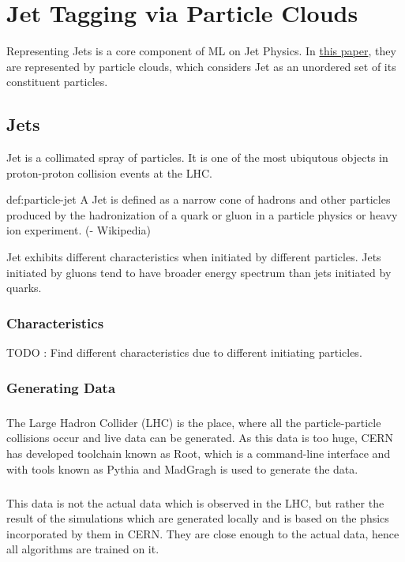 \chapter{Jet Tagging via Particle Clouds}

Representing Jets is a core component of ML on Jet Physics. In  
\href{run:../papers/Jet\ Tagging\ via\ Particle\ Clouds.pdf}{this paper}, 
they are represented by particle clouds, which considers Jet as an 
unordered set of its constituent particles.

\section{Jets}
Jet is a collimated spray of particles. It is one of the most ubiqutous 
objects in proton-proton collision events at the LHC.

\begin{definition}{def:particle-jet}
    A Jet is defined as a narrow cone of hadrons and other particles 
    produced by the hadronization of a quark or gluon in a particle physics 
    or heavy ion experiment.
    (- Wikipedia)
\end{definition}

\noindent Jet exhibits different characteristics when initiated by different 
particles. Jets initiated by gluons tend to have broader energy spectrum 
than jets initiated by quarks.

\subsection{Characteristics}
TODO : Find different characteristics due to different initiating particles.

\subsection{Generating Data}

\paragraph{} The Large Hadron Collider (LHC) is the place, where all the particle-particle collisions occur and live data can be generated. As this data is too huge, CERN has developed toolchain known as Root, which is a command-line interface and with tools known as Pythia and MadGragh is used to generate the data.

\paragraph{} This data is not the actual data which is observed in the LHC, but rather the result of the simulations which are generated locally and is based on the phsics incorporated by them in CERN. They are close enough to the actual data, hence all algorithms are trained on it.

